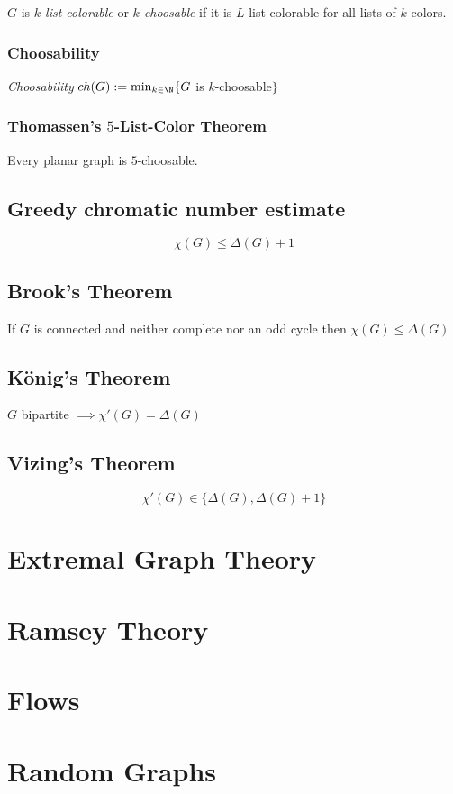 \spacing

$G$ is \emph{$k$-list-colorable} or \emph{$k$-choosable} if it is $L$-list-colorable for all lists of $k$ colors.

\subsubsection*{Choosability}

\emph{Choosability} $ch(G) := \min_{k\in\N}\{ G$ is $k$-choosable$\}$

\subsubsection*{Thomassen's $5$-List-Color Theorem}

Every planar graph is $5$-choosable.

\subsection*{Greedy chromatic number estimate}

$$\chi(G) \leq \Delta(G)+1$$

\subsection*{Brook's Theorem}

If $G$ is connected and neither complete nor an odd cycle then $\chi(G) \leq \Delta(G)$

\subsection*{König's Theorem}

$G$ bipartite $\implies \chi'(G) = \Delta(G)$

\subsection*{Vizing's Theorem}

$$\chi'(G) \in \{\Delta(G), \Delta(G)+1\}$$

\section*{Extremal Graph Theory}

\section*{Ramsey Theory}

\section*{Flows}

\section*{Random Graphs}
